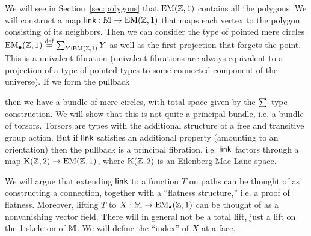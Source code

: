 We will see in Section~\ref{sec:polygons} that \( \mathrm{EM}(\mathbb{Z},1) \) contains all the polygons. We will construct a map \( \operatorname{\mathsf{link}}:\mathbb{M}\to\mathrm{EM}(\mathbb{Z},1) \) that maps each vertex to the polygon consisting of its neighbors. Then we can consider the type of pointed mere circles \( \mathrm{EM_{\bullet}}(\mathbb{Z},1)\stackrel{\mathrm{def}}{=} \sum_{Y:\mathrm{EM}(\mathbb{Z},1)}Y \) as well as the first projection that forgets the point. This is a univalent fibration (univalent fibrations are always equivalent to a projection of a type of pointed types to some connected component of the universe\cite{christensen_univalence}). If we form the pullback
\begin{center}
\end{center}
then we have a bundle of mere circles, with total space given by the \( \sum_{} \)-type construction. We will show that this is not quite a principal bundle, i.e. a bundle of torsors. Torsors are types with the additional structure of a free and transitive group action. But if \( \operatorname{\mathsf{link}}  \) satisfies an additional property (amounting to an orientation) then the pullback is a principal fibration, i.e. \( \operatorname{\mathsf{link}} \) factors through a map \( \mathrm{K}(\mathbb{Z},2)\to\mathrm{EM}(\mathbb{Z},1) \), where \( \mathrm{K}(\mathbb{Z},2) \) is an Eilenberg-Mac Lane space. 

We will argue that extending \( \operatorname{\mathsf{link}} \) to a function \( T \) on paths can be thought of as constructing a connection, together with a ``flatness structure,'' i.e. a proof of flatness. Moreover, lifting \( T \) to \( X:\mathbb{M}\to\mathrm{EM_{\bullet}}(\mathbb{Z},1) \) can be thought of as a nonvanishing vector field. There will in general not be a total lift, just a lift on the 1-skeleton of \( \mathbb{M} \). We will define the ``index'' of \( X \) at a face.

